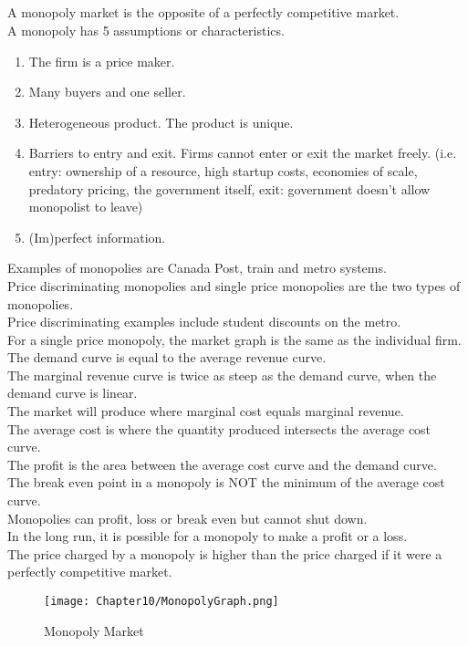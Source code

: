 \subsection{}
A monopoly market is the opposite of a perfectly competitive market.\\
A monopoly has 5 assumptions or characteristics.
\begin{enumerate}
    \item The firm is a price maker.
    \item Many buyers and one seller.
    \item Heterogeneous product. The product is unique.
    \item Barriers to entry and exit. Firms cannot enter or exit the market freely.
    (i.e. entry: ownership of a resource, high startup costs, economies of scale, predatory pricing, the government itself,
    exit: government doesn't allow monopolist to leave)
    \item (Im)perfect information.
\end{enumerate}
Examples of monopolies are Canada Post, train and metro systems.\\
Price discriminating monopolies and single price monopolies are the two types of monopolies.\\
Price discriminating examples include student discounts on the metro.\\
For a single price monopoly, the market graph is the same as the individual firm.
The demand curve is equal to the average revenue curve.\\
The marginal revenue curve is twice as steep as the demand curve, when the demand curve is linear.\\
The market will produce where marginal cost equals marginal revenue.\\
The average cost is where the quantity produced intersects the average cost curve.\\
The profit is the area between the average cost curve and the demand curve.\\
The break even point in a monopoly is NOT the minimum of the average cost curve.\\
Monopolies can profit, loss or break even but cannot shut down.\\
In the long run, it is possible for a monopoly to make a profit or a loss.\\
The price charged by a monopoly is higher than the price charged if it were a perfectly competitive market.
\begin{figure}[H]
    \centering
    \texttt{[image: Chapter10/MonopolyGraph.png]}
    \caption{Monopoly Market}
    \label{fig:monopoly}
\end{figure}